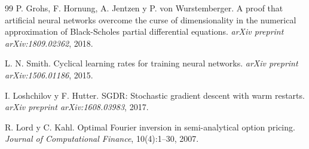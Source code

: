 \documentclass[11pt,a4paper]{article}
\begin{document}
\begin{thebibliography}{99}
P. Grohs, F. Hornung, A. Jentzen y P. von Wurstemberger.
\newblock A proof that artificial neural networks overcome the curse of dimensionality in the numerical approximation of Black-Scholes partial differential equations.
\newblock \emph{arXiv preprint arXiv:1809.02362}, 2018.


L. N. Smith.
\newblock Cyclical learning rates for training neural networks.
\newblock \emph{arXiv preprint arXiv:1506.01186}, 2015.

I. Loshchilov y F. Hutter.
\newblock SGDR: Stochastic gradient descent with warm restarts.
\newblock \emph{arXiv preprint arXiv:1608.03983}, 2017.

R. Lord y C. Kahl.
\newblock Optimal Fourier inversion in semi-analytical option pricing.
\newblock \emph{Journal of Computational Finance}, 10(4):1--30, 2007.

\end{thebibliography}
\end{document}
